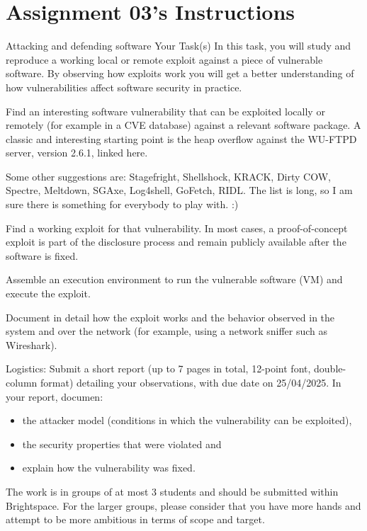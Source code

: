 \section{Assignment 03's Instructions}
\label{apx:assignment-instructions}

Attacking and defending software
Your Task(s)
In this task, you will study and reproduce a working local or remote exploit against a piece of vulnerable software. By observing how exploits work you will get a better understanding of how vulnerabilities affect software security in practice.

Find an interesting software vulnerability that can be exploited locally or remotely (for example in a CVE database) against a relevant software package. A classic and interesting starting point is the heap overflow against the WU-FTPD server, version 2.6.1, linked here. 

Some other suggestions are: Stagefright, Shellshock, KRACK, Dirty COW, Spectre, Meltdown, SGAxe, Log4shell, GoFetch, RIDL. The list is long, so I am sure there is something for everybody to play with. :)

Find a working exploit for that vulnerability. In most cases, a proof-of-concept exploit is part of the disclosure process and remain publicly available after the software is fixed.

Assemble an execution environment to run the vulnerable software (VM) and execute the exploit.

Document in detail how the exploit works and the behavior observed in the system and over the network (for example, using a network sniffer such as Wireshark).

Logistics:
Submit a short report (up to 7 pages in total, 12-point font, double-column format) detailing your observations, with due date on 25/04/2025. In your report, documen:


\begin{itemize}
    \item the attacker model (conditions in which the vulnerability can be exploited), 
    \item the security properties that were violated and 
    \item explain how the vulnerability was fixed. 
\end{itemize}

The work is in groups of at most 3 students and should be submitted within Brightspace. For the larger groups, please consider that you have more hands and attempt to be more ambitious in terms of scope and target.

